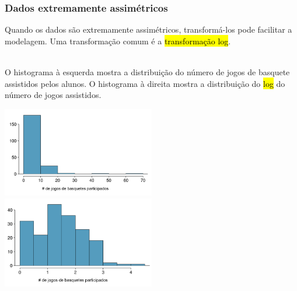 
\begin{frame}
\frametitle{Dados extremamente assimétricos}
\justifying
Quando os dados são extremamente assimétricos, transformá-los pode facilitar a modelagem. Uma transformação comum é a \hl{transformação log}.

$\:$ \\
\pause
\justifying
O histograma à esquerda mostra a distribuição do número de jogos de basquete assistidos pelos alunos. O histograma à direita mostra a distribuição do \hl{log} do número de jogos assistidos.

\begin{center}
\includegraphics[width=0.5\textwidth]{1-6_numerical_data/basket_games_hist.png}
\includegraphics[width=0.5\textwidth]{1-6_numerical_data/basket_games_hist_log.png}
\end{center}

\end{frame}


